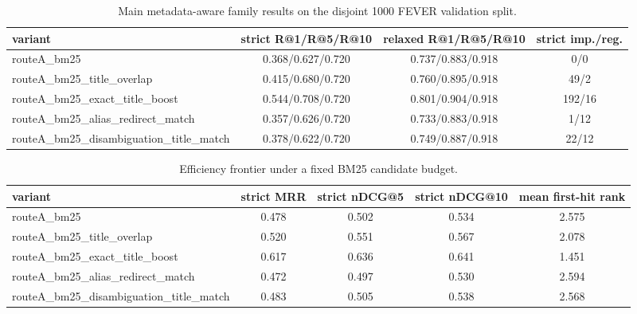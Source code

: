 
\begin{table}[t]
\centering
\caption{Main metadata-aware family results on the disjoint 1000 FEVER validation split.}
\begin{tabular}{lccc}
\hline
variant & strict R@1/R@5/R@10 & relaxed R@1/R@5/R@10 & strict imp./reg. \\
\hline
routeA\_bm25 & 0.368/0.627/0.720 & 0.737/0.883/0.918 & 0/0 \\
routeA\_bm25\_title\_overlap & 0.415/0.680/0.720 & 0.760/0.895/0.918 & 49/2 \\
routeA\_bm25\_exact\_title\_boost & 0.544/0.708/0.720 & 0.801/0.904/0.918 & 192/16 \\
routeA\_bm25\_alias\_redirect\_match & 0.357/0.626/0.720 & 0.733/0.883/0.918 & 1/12 \\
routeA\_bm25\_disambiguation\_title\_match & 0.378/0.622/0.720 & 0.749/0.887/0.918 & 22/12 \\
\hline
\end{tabular}
\end{table}

\begin{table}[t]
\centering
\caption{Efficiency frontier under a fixed BM25 candidate budget.}
\begin{tabular}{lcccc}
\hline
variant & strict MRR & strict nDCG@5 & strict nDCG@10 & mean first-hit rank \\
\hline
routeA\_bm25 & 0.478 & 0.502 & 0.534 & 2.575 \\
routeA\_bm25\_title\_overlap & 0.520 & 0.551 & 0.567 & 2.078 \\
routeA\_bm25\_exact\_title\_boost & 0.617 & 0.636 & 0.641 & 1.451 \\
routeA\_bm25\_alias\_redirect\_match & 0.472 & 0.497 & 0.530 & 2.594 \\
routeA\_bm25\_disambiguation\_title\_match & 0.483 & 0.505 & 0.538 & 2.568 \\
\hline
\end{tabular}
\end{table}

